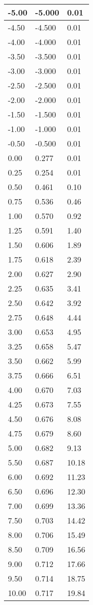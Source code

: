 \documentclass{article}
\begin{document}
\begin{tabular}{|l|l|l|}
  \hline
  -5.00 & -5.000 & 0.01 \\
  \hline
  -4.50 & -4.500 & 0.01 \\
  \hline
  -4.00 & -4.000 & 0.01 \\
  \hline
  -3.50 & -3.500 & 0.01 \\
  \hline
  -3.00 & -3.000 & 0.01 \\
  \hline
  -2.50 & -2.500 & 0.01 \\
  \hline
  -2.00 & -2.000 & 0.01 \\
  \hline
  -1.50 & -1.500 & 0.01 \\
  \hline
  -1.00 & -1.000 & 0.01 \\
  \hline
  -0.50 & -0.500 & 0.01 \\
  \hline
  0.00 & 0.277 & 0.01 \\
  \hline
  0.25 & 0.254 & 0.01 \\
  \hline
  0.50 & 0.461 & 0.10 \\
  \hline
  0.75 & 0.536 & 0.46 \\
  \hline
  1.00 & 0.570 & 0.92 \\
  \hline
  1.25 & 0.591 & 1.40 \\
  \hline
  1.50 & 0.606 & 1.89 \\
  \hline
  1.75 & 0.618 & 2.39 \\
  \hline
  2.00 & 0.627 & 2.90 \\
  \hline
  2.25 & 0.635 & 3.41 \\
  \hline
  2.50 & 0.642 & 3.92 \\
  \hline
  2.75 & 0.648 & 4.44 \\
  \hline
  3.00 & 0.653 & 4.95 \\
  \hline
  3.25 & 0.658 & 5.47 \\
  \hline
  3.50 & 0.662 & 5.99 \\
  \hline
  3.75 & 0.666 & 6.51 \\
  \hline
  4.00 & 0.670 & 7.03 \\
  \hline
  4.25 & 0.673 & 7.55 \\
  \hline
  4.50 & 0.676 & 8.08 \\
  \hline
  4.75 & 0.679 & 8.60 \\
  \hline
  5.00 & 0.682 & 9.13 \\
  \hline
  5.50 & 0.687 & 10.18 \\
  \hline
  6.00 & 0.692 & 11.23 \\
  \hline
  6.50 & 0.696 & 12.30 \\
  \hline
  7.00 & 0.699 & 13.36 \\
  \hline
  7.50 & 0.703 & 14.42 \\
  \hline
  8.00 & 0.706 & 15.49 \\
  \hline
  8.50 & 0.709 & 16.56 \\
  \hline
  9.00 & 0.712 & 17.66 \\
  \hline
  9.50 & 0.714 & 18.75 \\
  \hline
  10.00 & 0.717 & 19.84 \\
  \hline
\end{tabular}
\end{document}
